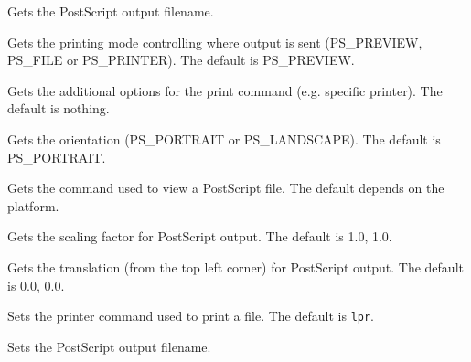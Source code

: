 
Gets the PostScript output filename.



Gets the printing mode controlling where output is sent (PS\_PREVIEW, PS\_FILE or PS\_PRINTER).
The default is PS\_PREVIEW.



Gets the additional options for the print command (e.g. specific printer). The default is nothing.



Gets the orientation (PS\_PORTRAIT or PS\_LANDSCAPE). The default is PS\_PORTRAIT.



Gets the command used to view a PostScript file. The default depends on the platform.



Gets the scaling factor for PostScript output. The default is 1.0, 1.0.



Gets the translation (from the top left corner) for PostScript output. The default is 0.0, 0.0.



Sets the printer command used to print a file. The default is {\tt lpr}.



Sets the PostScript output filename.


